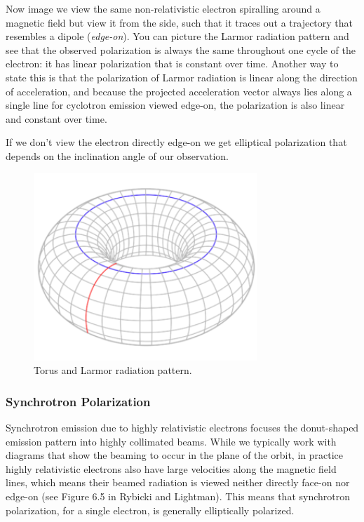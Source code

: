 \documentclass{article}
\begin{document}
Now image we view the same non-relativistic electron spiralling around a magnetic field but view it from the side, such that it traces out a trajectory that resembles a dipole (\emph{edge-on}). You can picture the Larmor radiation pattern and see that the observed polarization is always the same throughout one cycle of the electron: it has linear polarization that is constant over time. Another way to state this is that the polarization of Larmor radiation is linear along the direction of acceleration, and because the projected acceleration vector always lies along a single line for cyclotron emission viewed edge-on, the polarization is also linear and constant over time.

If we don't view the electron directly edge-on we get elliptical polarization that depends on the inclination angle of our observation.

\begin{figure}
    \centering
    \includegraphics[width=0.75\textwidth]{figures/300px-Torus.png}
    \caption{Torus and Larmor radiation pattern.}
    \label{fig:Torus.}
\end{figure}

\subsubsection{Synchrotron Polarization}

Synchrotron emission due to highly relativistic electrons focuses the donut-shaped emission pattern into highly collimated beams. While we typically work with diagrams that show the beaming to occur in the plane of the orbit, in practice highly relativistic electrons also have large velocities along the magnetic field lines, which means their beamed radiation is viewed neither directly face-on nor edge-on (see Figure 6.5 in Rybicki and Lightman). This means that synchrotron polarization, for a single electron, is generally elliptically polarized.
\end{document}
